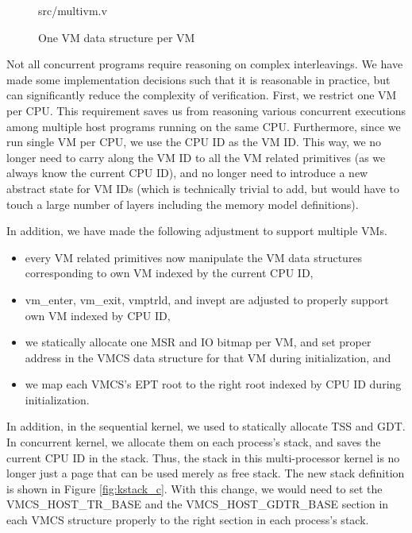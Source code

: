 \begin{figure}
	 {src/multivm.v}
	\caption{One VM data structure per VM}
	\label{fig:multivm_v}
\end{figure}

Not all concurrent programs require reasoning on complex interleavings. We have made
some implementation decisions such that it is reasonable in practice, but can significantly
reduce the complexity of verification. First, we restrict one VM per CPU. This requirement
saves us from reasoning various concurrent executions among multiple host programs running
on the same CPU. Furthermore, since we run single VM per CPU, we use the CPU ID as the VM ID.
This way, we no longer need to carry along the VM ID to all the VM related primitives (as we always
know the current CPU ID), and no longer need to introduce a new abstract state for VM IDs (which
is technically trivial to add, but would have to touch a large number of layers including the memory
model definitions).

In addition, we have made the following adjustment to support multiple VMs.

\begin{itemize}
\item every VM related primitives now manipulate the VM data structures corresponding to own
VM indexed by the current CPU ID,
\item \textsf{vm\_enter}, \textsf{vm\_exit}, \textsf{vmptrld}, and \textsf{invept} are adjusted
to properly support own VM indexed by CPU ID, 
\item we statically allocate one MSR and IO bitmap per VM, and set proper address in the
VMCS data structure for that VM during initialization, and
\item we map each VMCS's EPT root to the right root indexed by CPU ID during initialization.
\end{itemize}

In addition, in the sequential kernel, we used to statically allocate TSS and GDT.
In concurrent kernel, we allocate them on each process's stack, and saves the current CPU ID in the stack.
Thus, the stack in this multi-processor kernel is no longer just a page that can be used merely as free stack.
The new stack definition is shown in Figure \ref{fig:kstack_c}. 
With this change, we would need to set the \textsf{VMCS\_HOST\_TR\_BASE} and the
\textsf{VMCS\_HOST\_GDTR\_BASE} section in each VMCS structure properly to the right section 
in each process's stack.

